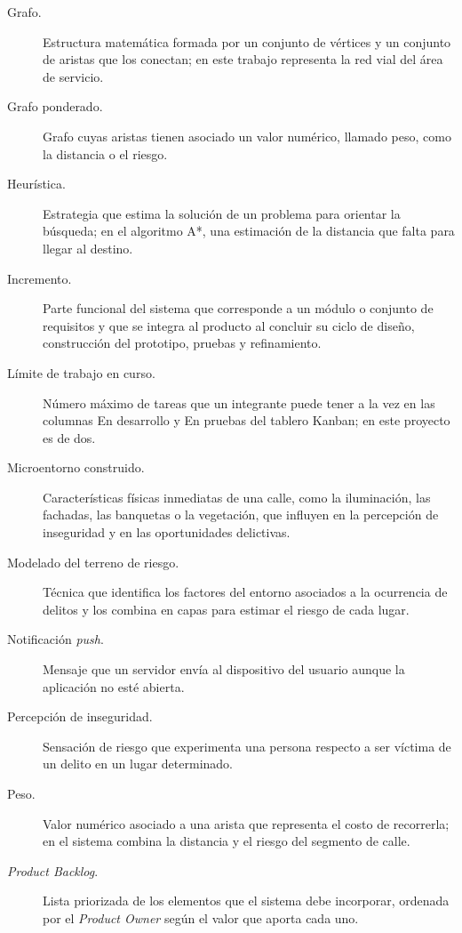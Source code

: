 \begin{description}
    \item[Grafo.] Estructura matemática formada por un conjunto de vértices y un conjunto de aristas que los conectan; en este trabajo representa la red vial del área de servicio.

    \item[Grafo ponderado.] Grafo cuyas aristas tienen asociado un valor numérico, llamado peso, como la distancia o el riesgo.

    \item[Heurística.] Estrategia que estima la solución de un problema para orientar la búsqueda; en el algoritmo A*, una estimación de la distancia que falta para llegar al destino.

    \item[Incremento.] Parte funcional del sistema que corresponde a un módulo o conjunto de requisitos y que se integra al producto al concluir su ciclo de diseño, construcción del prototipo, pruebas y refinamiento.

    \item[Límite de trabajo en curso.] Número máximo de tareas que un integrante puede tener a la vez en las columnas En desarrollo y En pruebas del tablero Kanban; en este proyecto es de dos.

    \item[Microentorno construido.] Características físicas inmediatas de una calle, como la iluminación, las fachadas, las banquetas o la vegetación, que influyen en la percepción de inseguridad y en las oportunidades delictivas.

    \item[Modelado del terreno de riesgo.] Técnica que identifica los factores del entorno asociados a la ocurrencia de delitos y los combina en capas para estimar el riesgo de cada lugar.

    \item[Notificación \textit{push}.] Mensaje que un servidor envía al dispositivo del usuario aunque la aplicación no esté abierta.

    \item[Percepción de inseguridad.] Sensación de riesgo que experimenta una persona respecto a ser víctima de un delito en un lugar determinado.

    \item[Peso.] Valor numérico asociado a una arista que representa el costo de recorrerla; en el sistema combina la distancia y el riesgo del segmento de calle.

    \item[\textit{Product Backlog}.] Lista priorizada de los elementos que el sistema debe incorporar, ordenada por el \textit{Product Owner} según el valor que aporta cada uno.


\end{description}
